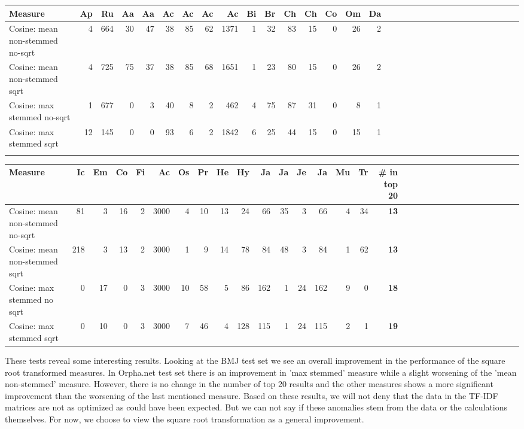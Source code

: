 \begin{table}[H]
\label{testResult_termDoc_orphan_hist_3000_ns_mea_ns_mea_sqr_s_max_s_max_sqr}
\begin{tiny}
  \begin{tabular}{|l|r|r|r|r|r|r|r|r|r|r|r|r|r|r|r|r|r|r|r|r|r|r|r|r|r|r|r|r|r|r|r|}
    \hline
    Measure &Ap&Ru&Aa&Aa&Ac&Ac&Ac&Ac&Bi&Br&Ch&Ch&Co&Om&Da\\
    \hline
    Cosine: mean non-stemmed no-sqrt &4&664&30&47&38&85&62&1371&1&32&83&15&0&26&2\\
    \hline
    Cosine: mean non-stemmed sqrt &4&725&75&37&38&85&68&1651&1&23&80&15&0&26&2\\
    \hline
    Cosine: max stemmed no-sqrt &1&677&0&3&40&8&2&462&4&75&87&31&0&8&1\\
    \hline
    Cosine: max stemmed sqrt &12&145&0&0&93&6&2&1842&6&25&44&15&0&15&1 \\
    \hline
    \multicolumn{16}{c}{} \\
    \end{tabular}
    \begin{tabular}{|l|r|r|r|r|r|r|r|r|r|r|r|r|r|r|r|r|r|r|r|r|r|r|r|r|r|r|r|r|r|r|}
    \hline
     Measure &Ic&Em&Co&Fi&Ac&Os&Pr&He&Hy&Ja&Ja&Je&Ja&Mu&Tr &\scriptsize{\textbf{\# in top 20}} \\
    \hline
    Cosine: mean non-stemmed no-sqrt &81&3&16&2&3000&4&10&13&24&66&35&3&66&4&34 & \scriptsize{\textbf{13}} \\
    \hline
    Cosine: mean non-stemmed sqrt &218&3&13&2&3000&1&9&14&78&84&48&3&84&1&62 & \scriptsize{\textbf{13}} \\
    \hline
    Cosine: max stemmed no sqrt &0&17&0&3&3000&10&58&5&86&162&1&24&162&9&0 & \scriptsize{\textbf{18}} \\
    \hline
    Cosine: max stemmed sqrt &0&10&0&3&3000&7&46&4&128&115&1&24&115&2&1 & \scriptsize{\textbf{19}} \\
    \hline
  \end{tabular}
\end{tiny}
\end{table}

These tests reveal some interesting results. Looking at the BMJ test set we see an overall 
improvement in the performance of the square root transformed measures. In Orpha.net test 
set there is an improvement in 'max stemmed' measure while a slight worsening of the 'mean 
non-stemmed' measure. However, there is no change in the number of top 20 results and the 
other measures shows a more significant improvement than the worsening of the last mentioned 
measure. Based on these results, we will not deny that the data in the TF-IDF matrices are 
not as optimized as could have been expected. But we can not say if these anomalies stem from 
the data or the calculations themselves. For now, we choose to view the square root 
transformation as a general improvement.


